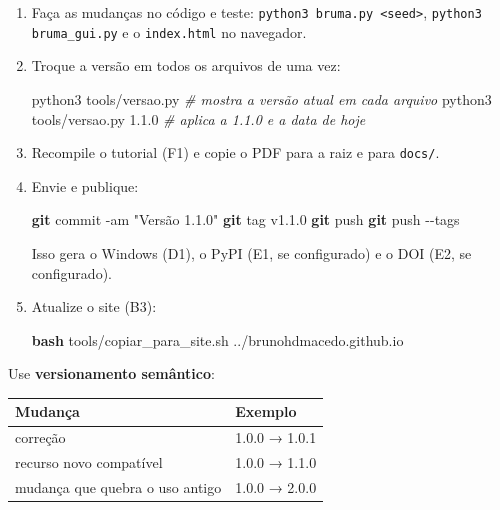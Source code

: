 \documentclass[
  10pt,
]{article}
\newenvironment{Shaded}{\begin{snugshade}}{\end{snugshade}}
\newcommand{\AttributeTok}[1]{\textcolor[rgb]{0.13,0.29,0.53}{#1}}
\newcommand{\CommentTok}[1]{\textcolor[rgb]{0.56,0.35,0.01}{\textit{#1}}}
\newcommand{\ExtensionTok}[1]{#1}
\newcommand{\FunctionTok}[1]{\textcolor[rgb]{0.13,0.29,0.53}{\textbf{#1}}}
\newcommand{\NormalTok}[1]{#1}
\newcommand{\StringTok}[1]{\textcolor[rgb]{0.31,0.60,0.02}{#1}}
\begin{document}
\begin{enumerate}
\def\labelenumi{\arabic{enumi}.}
\item
  Faça as mudanças no código e teste:
  \texttt{python3 bruma.\allowbreak{}py <seed>},
  \texttt{python3 bruma\_\allowbreak{}gui.\allowbreak{}py} e o
  \texttt{index.\allowbreak{}html} no navegador.
\item
  Troque a versão em todos os arquivos de uma vez:

\begin{Shaded}
\begin{Highlighting}[]
\ExtensionTok{python3}\NormalTok{ tools/versao.py            }\CommentTok{\# mostra a versão atual em cada arquivo}
\ExtensionTok{python3}\NormalTok{ tools/versao.py 1.1.0      }\CommentTok{\# aplica a 1.1.0 e a data de hoje}
\end{Highlighting}
\end{Shaded}
\item
  Recompile o tutorial (F1) e copie o PDF para a raiz e para
  \texttt{docs/\allowbreak{}}.
\item
  Envie e publique:

\begin{Shaded}
\begin{Highlighting}[]
\FunctionTok{git}\NormalTok{ commit }\AttributeTok{{-}am} \StringTok{"Versão 1.1.0"}
\FunctionTok{git}\NormalTok{ tag v1.1.0}
\FunctionTok{git}\NormalTok{ push}
\FunctionTok{git}\NormalTok{ push }\AttributeTok{{-}{-}tags}
\end{Highlighting}
\end{Shaded}

  Isso gera o Windows (D1), o PyPI (E1, se configurado) e o DOI (E2, se
  configurado).
\item
  Atualize o site (B3):

\begin{Shaded}
\begin{Highlighting}[]
\FunctionTok{bash}\NormalTok{ tools/copiar\_para\_site.sh ../brunohdmacedo.github.io}
\end{Highlighting}
\end{Shaded}
\end{enumerate}

Use \textbf{versionamento semântico}:

\begin{longtable}[]{@{}ll@{}}
\toprule\noalign{}
Mudança & Exemplo \\
\midrule\noalign{}
\endhead
\bottomrule\noalign{}
\endlastfoot
correção & 1.0.0 → 1.0.1 \\
recurso novo compatível & 1.0.0 → 1.1.0 \\
mudança que quebra o uso antigo & 1.0.0 → 2.0.0 \\
\end{longtable}
\end{document}
